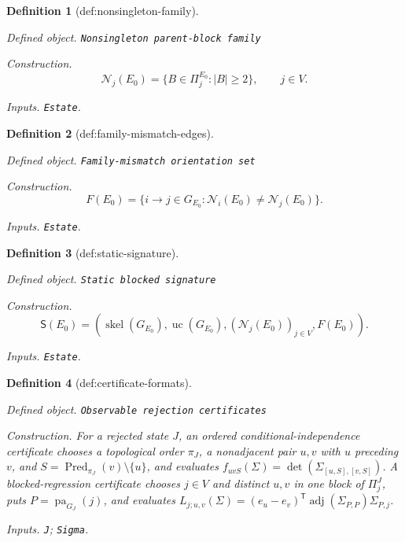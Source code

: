 \documentclass{article}
\newtheorem{definition}{Definition}
\begin{document}
\begin{definition}[def:nonsingleton-family]\label{def:nonsingleton-family}
\par\smallskip\noindent\emph{Defined object.} \texttt{Nonsingleton parent-\allowbreak{}block family}
\par\smallskip\noindent\emph{Construction.} \[\mathcal N_j(E_0)=\{B\in\Pi^{E_0}_j:|B|\geq2\},\qquad j\in V.\]
\par\smallskip\noindent\emph{Inputs.} \texttt{Estate}.
\end{definition}

\begin{definition}[def:family-mismatch-edges]\label{def:family-mismatch-edges}
\par\smallskip\noindent\emph{Defined object.} \texttt{Family-\allowbreak{}mismatch orientation set}
\par\smallskip\noindent\emph{Construction.} \[F(E_0)=\{i\to j\in G_{E_0}:\mathcal N_i(E_0)\neq\mathcal N_j(E_0)\}.\]
\par\smallskip\noindent\emph{Inputs.} \texttt{Estate}.
\end{definition}

\begin{definition}[def:static-signature]\label{def:static-signature}
\par\smallskip\noindent\emph{Defined object.} \texttt{Static blocked signature}
\par\smallskip\noindent\emph{Construction.} \[\mathsf S(E_0)=\left(\operatorname{skel}(G_{E_0}),\operatorname{uc}(G_{E_0}),(\mathcal N_j(E_0))_{j\in V},F(E_0)\right).\]
\par\smallskip\noindent\emph{Inputs.} \texttt{Estate}.
\end{definition}

\begin{definition}[def:certificate-formats]\label{def:certificate-formats}
\par\smallskip\noindent\emph{Defined object.} \texttt{Observable rejection certificates}
\par\smallskip\noindent\emph{Construction.} For a rejected state \(J\), an ordered conditional-independence certificate chooses a topological order \(\pi_J\), a nonadjacent pair \(u,v\) with \(u\) preceding \(v\), and \(S=\operatorname{Pred}_{\pi_J}(v)\setminus\{u\}\), and evaluates \(f_{uvS}(\Sigma)=\det(\Sigma_{[u,S],[v,S]})\). A blocked-regression certificate chooses \(j\in V\) and distinct \(u,v\) in one block of \(\Pi^J_j\), puts \(P=\operatorname{pa}_{G_J}(j)\), and evaluates \(L_{j;u,v}(\Sigma)=(e_u-e_v)^{\mathsf T}\operatorname{adj}(\Sigma_{P,P})\Sigma_{P,j}\).
\par\smallskip\noindent\emph{Inputs.} \texttt{J}; \texttt{Sigma}.
\end{definition}
\end{document}
